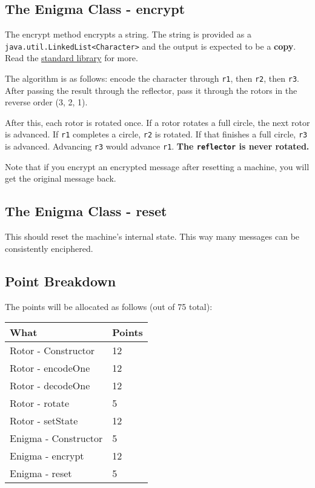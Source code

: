\documentclass[11pt]{article}
\begin{document}
\subsection{The Enigma Class - encrypt}
The encrypt method encrypts a string. The string is provided as a
\texttt{java.util.LinkedList<Character>} and the output
is expected to be a \textbf{copy}. Read the \href{http://docs.oracle.com/javase/7/docs/api/java/util/LinkedList.html?is-external=true}{standard library} for more.

The algorithm is as follows: encode the character through \texttt{r1}, then \texttt{r2}, then \texttt{r3}. After passing the result through
the reflector, pass it through the rotors in the reverse order (3, 2, 1).

After this, each rotor is rotated once. If a rotor rotates a full circle, the next rotor is advanced.
If \texttt{r1} completes a circle, \texttt{r2} is rotated. If that finishes a full circle, \texttt{r3} is advanced. Advancing \texttt{r3} would advance \texttt{r1}. \textbf{The \texttt{reflector} is never rotated.}

Note that if you encrypt an encrypted message after resetting a machine, you will get the original message back.

\subsection{The Enigma Class - reset}
This should reset the machine's internal state. This way many messages can be consistently enciphered.

\subsection{Point Breakdown}
The points will be allocated as follows (out of 75 total):
\begin{tabular}{l | l}
  What & Points \\ \hline
  Rotor - Constructor & 12 \\
  Rotor - encodeOne & 12 \\
  Rotor - decodeOne & 12 \\
  Rotor - rotate & 5 \\
  Rotor - setState & 12 \\
  Enigma - Constructor & 5 \\
  Enigma - encrypt & 12 \\
  Enigma - reset & 5 \\
\end{tabular}
\end{document}

